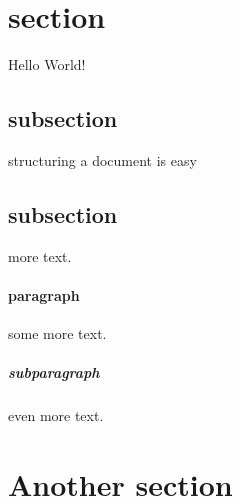 \documentclass{article}
\begin{document}
	\section{section}
	Hello World!
	\subsection{subsection}
	structuring a document is easy
	\subsection{subsection}
	more text.
	\paragraph{paragraph}
	some more text.
	\subparagraph{subparagraph}
	even more text.
	\section{Another section}
\end{document}
